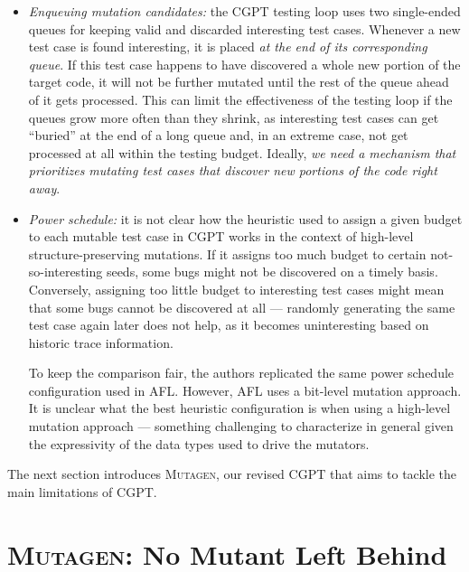 \documentclass[sigconf, anonymous, review]{acmart}
\newcommand{\mutagen}{\textsc{Mutagen}\xspace}
\begin{document}
\begin{itemize}
\item \emph{Enqueuing mutation candidates:}
%
the CGPT testing loop uses two single-ended queues for keeping valid and
discarded interesting test cases.
%
Whenever a new test case is found interesting, it is placed \emph{at the end of
  its corresponding queue}.
%
If this test case happens to have discovered a whole new portion of the target
code, it will not be further mutated until the rest of the queue ahead of it
gets processed.
%
This can limit the effectiveness of the testing loop if the queues grow more
often than they shrink, as interesting test cases can get ``buried'' at the end
of a long queue and,
%
%
in an extreme case, not get processed at all within the testing budget.
%
Ideally, \emph{we need a mechanism that prioritizes mutating test cases that
  discover new portions of the code right away}.
%
%

\item \emph{Power schedule:}
%
it is not clear how the heuristic used to assign a given budget to each mutable
test case in CGPT works in the context of high-level structure-preserving
mutations.
%
If it assigns too much budget to certain not-so-interesting seeds, some bugs
might not be discovered on a timely basis.
%
Conversely, assigning too little budget to interesting test cases might mean
that some bugs cannot be discovered at all --- randomly generating the same test
case again later does not help, as it becomes uninteresting based on historic
trace information.

To keep the comparison fair, the authors replicated the same power schedule
configuration used in AFL.
%
However, AFL uses a bit-level mutation approach.
%
It is unclear what the best heuristic configuration is when using a high-level
mutation approach --- something challenging to characterize in general given the
expressivity of the data types used to drive the mutators.
\end{itemize}

The next section introduces \mutagen, our revised CGPT that aims to tackle the
main limitations of CGPT.


\section{\mutagen: No Mutant Left Behind}
\label{sec:mutagen}
\end{document}
